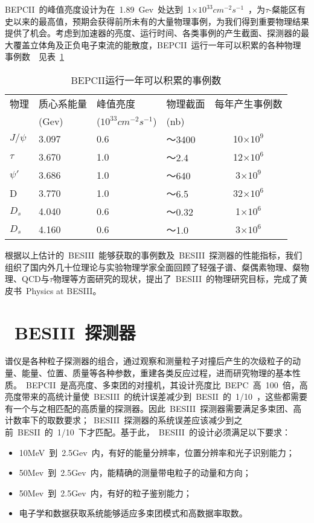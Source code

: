 BEPCII~的峰值亮度设计为在~1.89~Gev~处达到~1$\times$$10^{33}$$cm^{-2}$$s^{-1}$~，为$\tau$-粲能区有史以来的最高值，预期会获得前所未有的大量物理事例，为我们得到重要物理结果提供了机会。考虑到加速器的亮度、运行时间、各类事例的产生截面、探测器的最大覆盖立体角及正负电子束流的能散度，BEPCII~运行一年可以积累的各种物理事例数~\cite{yuancz:2002}~见表~\ref{tbl:event-Number}~

\begin{table}[h]
    \centering
    \caption{\label{tbl:event-Number} BEPCII运行一年可以积累的事例数}
    \footnotesize
    \begin{tabular}{llllc}
        \hline
        物理& 质心系能量& 峰值亮度& 物理截面& 每年产生事例数 \\
             &(Gev)      &($10^{33} $$cm^{-2}$$s^{-1}$)& (nb)\\
        \hline
        $J/\psi$& 3.097& 0.6& ～3400&  10$\times$$10^{9}$ \\
        $\tau$&   3.670& 1.0& ～2.4&    12$\times$$10^{6}$ \\
        $\psi'$&  3.686& 1.0& ～640&    3$\times$$10^{9}$\\
        D&        3.770& 1.0& ～6.5&    32$\times$$10^{6}$\\
        $D_{s}$&   4.040& 0.6& ～0.32&   1$\times$$10^{6}$\\
        $D_{s}$&   4.160& 0.6& ～1.0&    3$\times$$10^{6}$\\
        \hline
    \end{tabular}
\end{table}

根据以上估计的~BESIII~能够获取的事例数及~BESIII~探测器的性能指标，我们组织了国内外几十位理论与实验物理学家全面回顾了轻强子谱、粲偶素物理、粲物理、QCD与$\tau$物理等方面研究的现状，提出了~BESIII~的物理研究目标，完成了黄皮书~Physics at BESIII。~\cite{chaokt:2009}~\cite{wangyf2011}~

\section{~BESIII~探测器}
谱仪是各种粒子探测器的组合，通过观察和测量粒子对撞后产生的次级粒子的动量、能量、位置、质量等各种参数，重建各类反应过程，进而研究物理的基本性质。~BEPCII~是高亮度、多束团的对撞机，其设计亮度比~BEPC~高~100~倍，高亮度带来的高统计量使~BESIII~的统计误差减少到~BESII~的~1/10~，这些都需要有一个与之相匹配的高质量的探测器。因此~BESIII~探测器需要满足多束团、高计数率下的取数要求；~BESIII~探测器的系统误差应该减少到之前~BESII~的~1/10~下才匹配。基于此，~BESIII~的设计必须满足以下要求：
\begin{itemize}
\item{10MeV~到~2.5Gev~内，有好的能量分辨率，位置分辨率和光子识别能力；}
\item{50Mev~到~2.5Gev~内，能精确的测量带电粒子的动量和方向；}
\item{50Mev~到~2.5Gev~内，有好的粒子鉴别能力；}
\item{电子学和数据获取系统能够适应多束团模式和高数据率取数。}
\end{itemize}

